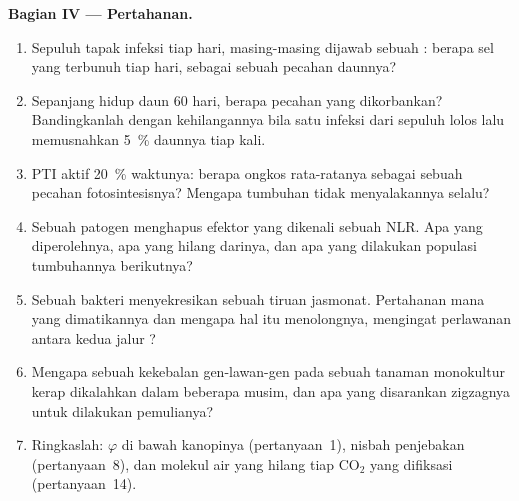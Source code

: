 \begin{problem}
\medskip
\noindent\textbf{Bagian IV --- Pertahanan.}
\begin{enumerate}[resume]
  \item Sepuluh tapak infeksi tiap hari, masing-masing dijawab sebuah : berapa sel yang terbunuh tiap hari, sebagai sebuah pecahan daunnya?
  \item Sepanjang hidup daun 60 hari, berapa pecahan yang dikorbankan? Bandingkanlah
        dengan kehilangannya bila satu infeksi dari sepuluh lolos lalu memusnahkan
        \qty{5}{\%} daunnya tiap kali.
  \item PTI aktif \qty{20}{\%} waktunya: berapa ongkos rata-ratanya sebagai sebuah pecahan
        fotosintesisnya? Mengapa tumbuhan tidak menyalakannya selalu?
  \item Sebuah patogen menghapus efektor yang dikenali sebuah NLR. Apa yang
        diperolehnya, apa yang hilang darinya, dan apa yang dilakukan populasi tumbuhannya
        berikutnya?
  \item Sebuah bakteri menyekresikan sebuah tiruan jasmonat. Pertahanan mana yang
        dimatikannya dan mengapa hal itu menolongnya, mengingat perlawanan
        antara kedua jalur ?
  \item Mengapa sebuah kekebalan gen-lawan-gen pada sebuah tanaman monokultur kerap
        dikalahkan dalam beberapa musim, dan apa yang disarankan zigzagnya untuk
        dilakukan pemulianya?
  \item Ringkaslah: $\varphi$ di bawah kanopinya (pertanyaan~1), nisbah
        penjebakan  (pertanyaan~8), dan molekul air yang hilang tiap
        CO$_{2}$ yang difiksasi (pertanyaan~14).
\end{enumerate}
\end{problem}
